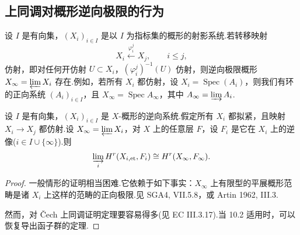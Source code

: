 \subsection*{上同调对概形逆向极限的行为}

设 $I$ 是有向集，$(X_i)_{i \in I}$ 是以 $I$ 为指标集的概形的射影系统.若转移映射
\[
X_i \xleftarrow{\varphi^{j}_i} X_j, \qquad i \leq j,
\]
仿射，即对任何开仿射 $U \subset X_i$，$(\varphi^{j}_i)^{-1}(U)$ 仿射，则逆向极限概形 $X_\infty = \varprojlim X_i$ 存在.例如，若所有 $X_i$ 都仿射，设 $X_i = \operatorname{Spec}(A_i)$，则我们有环的正向系统 $(A_i)_{i \in I}$，且 $X_\infty = \operatorname{Spec} A_\infty$，其中 $A_\infty = \varinjlim A_i$.

\begin{theorem}\label{thm:10.9}
设 $I$ 是有向集，$(X_i)_{i \in I}$ 是 $X$-概形的逆向系统.假定所有 $X_i$ 都拟紧，且映射 $X_i \to X_j$ 都仿射.设 $X_\infty = \varprojlim X_i$，对 $X$ 上的任意层 $F$，设 $F_i$ 是它在 $X_i$ 上的逆像($i \in I \cup \{\infty\}$).则
\[
\varinjlim_{i} H^{r}(X_{i,\mathrm{et}}, F_i) \cong H^{r}(X_\infty, F_\infty).
\]
\end{theorem}

\begin{proof}
一般情形的证明相当困难.它依赖于如下事实：$X_\infty$ 上有限型的平展概形范畴是诸 $X_i$ 上这样的范畴的正向极限.见 SGA4, VII.5.8，或 Artin 1962, III.3.

然而，对 \v{C}ech 上同调证明定理要容易得多(见 EC III.3.17).当 10.2 适用时，可以恢复导出函子群的定理.
\end{proof}
